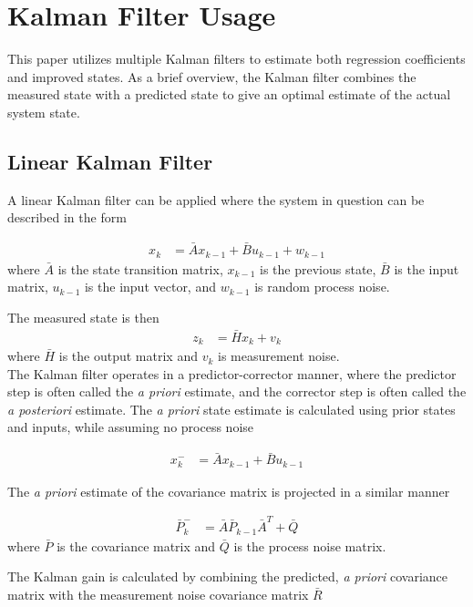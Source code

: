 \section{Kalman Filter Usage}
\label{kalman-filter}
This paper utilizes multiple Kalman filters to estimate both regression coefficients and improved states. As a brief overview, the Kalman filter combines the measured state with a predicted state to give an optimal\cite{kalman60} estimate of the actual system state.

\subsection*{Linear Kalman Filter}
A linear Kalman filter can be applied\cite{welch1995introduction} where the system in question can be described in the form 

\begin{align}
x_k &= \bar{A}x_{k-1} + \bar{B}u_{k-1}+w_{k-1}
\end{align}
\noindent
where $\bar{A}$ is the state transition matrix, $x_{k-1}$ is the previous state, $\bar{B}$ is the input matrix, $u_{k-1}$ is the input vector, and $w_{k-1}$ is random process noise.

The measured state is then 
\begin{align}
z_k &= \bar{H}x_k+v_k
\end{align} 
\noindent
where $\bar{H}$ is the output matrix and $v_k$ is measurement noise.\\
The Kalman filter operates in a predictor-corrector manner, where the predictor step is often called the \textit{a priori} estimate, and the corrector step is often called the \textit{a posteriori} estimate. The \textit{a priori} state estimate is calculated using prior states and inputs, while assuming no process noise

\begin{align}
x^-_k &= \bar{A}x_{k-1}+\bar{B}u_{k-1}
\end{align}

The \textit{a priori} estimate of the covariance matrix is projected in a similar manner

\begin{align}
\bar{P}^-_k &= \bar{A}\bar{P}_{k-1}\bar{A}^T+\bar{Q}
\end{align}
\noindent
where $\bar{P}$ is the covariance matrix and $\bar{Q}$ is the process noise matrix.

The Kalman gain is calculated by combining the predicted, \textit{a priori} covariance matrix with the measurement noise covariance matrix $\bar{R}$

